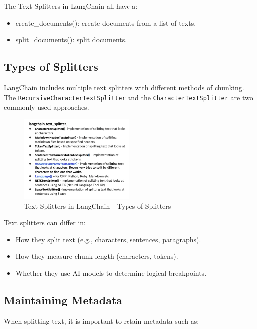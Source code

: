 \documentclass{article}
\begin{document}
The Text Splitters in LangChain all have a:
\begin{itemize}
    \item create\_documents(): create documents from a list of texts.
    \item split\_documents(): split documents.
\end{itemize}

\subsection{Types of Splitters}

LangChain includes multiple text splitters with different methods of chunking. The \texttt{RecursiveCharacterTextSplitter} and the \texttt{CharacterTextSplitter} are two commonly used approaches.

\begin{figure}[H]
    \centering
    \includegraphics[width=0.5\textwidth]{images/langchain_chat_with_your_data_007.png}
    \caption{Text Splitters in LangChain - Types of Splitters}
    \label{fig:text_splitters_in_langchain_types_of_splitters}
\end{figure}

Text splitters can differ in:

\begin{itemize}
    \item How they split text (e.g., characters, sentences, paragraphs).
    \item How they measure chunk length (characters, tokens).
    \item Whether they use AI models to determine logical breakpoints.
\end{itemize}

\subsection{Maintaining Metadata}

When splitting text, it is important to retain metadata such as:
\end{document}
